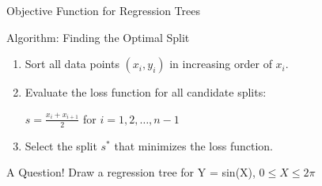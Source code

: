 \documentclass[usenames,dvipsnames]{beamer}
\begin{document}
\begin{frame}{Objective Function for Regression Trees}
\small
{}
\end{frame}

\begin{frame}{Algorithm: Finding the Optimal Split}
\begin{enumerate}
\item<1-> Sort all data points $(x_i, y_i)$ in increasing order of $x_i$.
\item<2-> Evaluate the loss function for all candidate splits:
\vspace{0.25cm}
\begin{center}
$s = \frac{x_i + x_{i+1}}{2}$ for $i = 1, 2, \ldots, n-1$
\end{center}
\vspace{0.25cm}
\item<2-> Select the split $s^*$ that minimizes the loss function.
\end{enumerate} 
\end{frame}


\begin{frame}{A Question!}
Draw a regression tree for Y = sin(X), $0 \leq X \leq 2\pi$ 
\end{frame}
\end{document}
